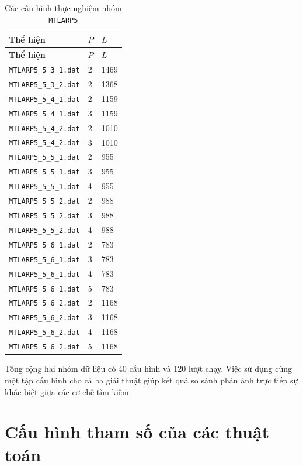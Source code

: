 \begin{longtable}{p{5.4cm}C{1.2cm}C{1.8cm}}
\caption{Các cấu hình thực nghiệm nhóm \texttt{MTLARP5}}
\label{tab:mtlarp5-configs}\\
\toprule
\textbf{Thể hiện} & \textbf{\(P\)} & \textbf{\(L\)} \\
\midrule
\endfirsthead
\toprule
\textbf{Thể hiện} & \textbf{\(P\)} & \textbf{\(L\)} \\
\midrule
\endhead
\bottomrule
\endfoot
\texttt{MTLARP5\_5\_3\_1.dat} & 2 & 1469 \\
\texttt{MTLARP5\_5\_3\_2.dat} & 2 & 1368 \\
\texttt{MTLARP5\_5\_4\_1.dat} & 2 & 1159 \\
\texttt{MTLARP5\_5\_4\_1.dat} & 3 & 1159 \\
\texttt{MTLARP5\_5\_4\_2.dat} & 2 & 1010 \\
\texttt{MTLARP5\_5\_4\_2.dat} & 3 & 1010 \\
\texttt{MTLARP5\_5\_5\_1.dat} & 2 & 955 \\
\texttt{MTLARP5\_5\_5\_1.dat} & 3 & 955 \\
\texttt{MTLARP5\_5\_5\_1.dat} & 4 & 955 \\
\texttt{MTLARP5\_5\_5\_2.dat} & 2 & 988 \\
\texttt{MTLARP5\_5\_5\_2.dat} & 3 & 988 \\
\texttt{MTLARP5\_5\_5\_2.dat} & 4 & 988 \\
\texttt{MTLARP5\_5\_6\_1.dat} & 2 & 783 \\
\texttt{MTLARP5\_5\_6\_1.dat} & 3 & 783 \\
\texttt{MTLARP5\_5\_6\_1.dat} & 4 & 783 \\
\texttt{MTLARP5\_5\_6\_1.dat} & 5 & 783 \\
\texttt{MTLARP5\_5\_6\_2.dat} & 2 & 1168 \\
\texttt{MTLARP5\_5\_6\_2.dat} & 3 & 1168 \\
\texttt{MTLARP5\_5\_6\_2.dat} & 4 & 1168 \\
\texttt{MTLARP5\_5\_6\_2.dat} & 5 & 1168 \\
\end{longtable}

Tổng cộng hai nhóm dữ liệu có 40 cấu hình và 120 lượt chạy. Việc sử dụng cùng một tập cấu hình cho cả ba giải thuật giúp kết quả so sánh phản ánh trực tiếp sự khác biệt giữa các cơ chế tìm kiếm.

\section{Cấu hình tham số của các thuật toán}
\label{sec:experiment-parameters}

